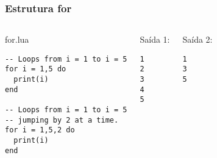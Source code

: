 \documentclass[brazil]{beamer}
\begin{document}
\begin{frame}[fragile]
  \frametitle{Estrutura for}
  \pause
  \begin{columns}
      \begin{block}{for.lua}
        \begin{lstlisting}
-- Loops from i = 1 to i = 5
for i = 1,5 do
  print(i)
end

-- Loops from i = 1 to i = 5
-- jumping by 2 at a time.
for i = 1,5,2 do
  print(i)
end
        \end{lstlisting}
      \end{block}
    \pause
      \begin{block}{Saída 1:}
        \begin{verbatim}
1
2
3
4
5 \end{verbatim}
      \end{block}
      \pause
      \begin{block}{Saída 2:}
        \begin{verbatim}
1
3
5 \end{verbatim}
      \end{block}
  \end{columns}
\end{frame}
\end{document}
